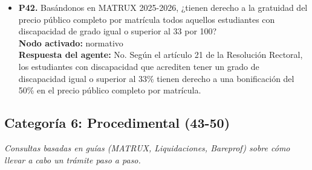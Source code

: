 \documentclass{article}
\begin{document}
\begin{itemize}
      \item \textbf{P42.} Basándonos en MATRUX 2025-2026, ¿tienen derecho a la gratuidad del precio público completo por matrícula todos aquellos estudiantes con discapacidad de grado igual o superior al 33 por 100? \\
            \textbf{Nodo activado:} normativo \\
            \textbf{Respuesta del agente:} No. Según el artículo 21 de la Resolución Rectoral, los estudiantes con discapacidad que acrediten tener un grado de discapacidad igual o superior al 33\% tienen derecho a una bonificación del 50\% en el precio público completo por matrícula.

\end{itemize}

\subsection{Categoría 6: Procedimental (43-50)}
\textit{Consultas basadas en guías (MATRUX, Liquidaciones, Bareprof) sobre cómo llevar a cabo un trámite paso a paso.}
\end{document}
